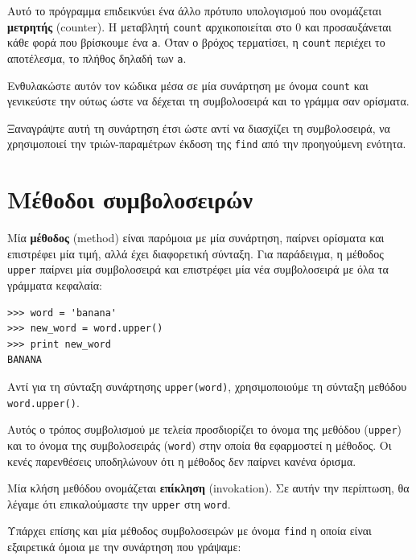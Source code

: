 \documentclass[10pt]{book}
\begin{document}
Αυτό το πρόγραμμα επιδεικνύει ένα άλλο πρότυπο υπολογισμού που ονομάζεται {\bf μετρητής} (counter). Η μεταβλητή {\tt count} αρχικοποιείται στο 0 και προσαυξάνεται κάθε φορά που βρίσκουμε ένα {\tt a}. Όταν ο βρόχος τερματίσει, η  {\tt count} περιέχει το αποτέλεσμα, το πλήθος δηλαδή των {\tt a}. 
\\
\begin{exercise}

Ενθυλακώστε αυτόν τον κώδικα μέσα σε μία συνάρτηση με όνομα {\tt count}
και γενικεύστε την ούτως ώστε να δέχεται τη συμβολοσειρά και το γράμμα σαν ορίσματα.
\\
\end{exercise}

\begin{exercise}

Ξαναγράψτε αυτή τη συνάρτηση έτσι ώστε αντί να διασχίζει τη συμβολοσειρά, να χρησιμοποιεί την τριών-παραμέτρων έκδοση της {\tt find} από την προηγούμενη ενότητα.
\end{exercise}


\section{Μέθοδοι συμβολοσειρών}

Μία {\bf μέθοδος} (method) είναι παρόμοια με μία συνάρτηση, παίρνει ορίσματα και επιστρέφει μία τιμή, αλλά έχει διαφορετική σύνταξη. Για παράδειγμα, η μέθοδος {\tt upper} παίρνει μία συμβολοσειρά και επιστρέφει μία νέα συμβολοσειρά με όλα τα γράμματα κεφαλαία:

\begin{verbatim}
>>> word = 'banana'
>>> new_word = word.upper()
>>> print new_word
BANANA
\end{verbatim}
%
Αντί για τη σύνταξη συνάρτησης {\tt upper(word)}, χρησιμοποιούμε τη σύνταξη μεθόδου {\tt word.upper()}.

 Αυτός ο τρόπος συμβολισμού με τελεία προσδιορίζει το όνομα της μεθόδου  ({\tt upper})  και το όνομα της συμβολοσειράς  ({\tt word})  στην οποία θα εφαρμοστεί η μέθοδος. Οι  κενές παρενθέσεις υποδηλώνουν ότι η μέθοδος δεν παίρνει κανένα όρισμα.

Μία κλήση μεθόδου ονομάζεται {\bf επίκληση} (invokation). Σε αυτήν την περίπτωση, θα λέγαμε ότι επικαλούμαστε την {\tt upper} στη {\tt word}. 

Υπάρχει επίσης και μία μέθοδος συμβολοσειρών με όνομα {\tt find} η οποία είναι εξαιρετικά όμοια με την συνάρτηση που γράψαμε:
\end{document}

